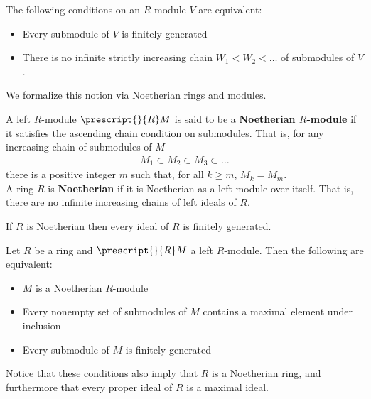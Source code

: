 \documentclass{memoir}
\begin{document}



\begin{prop}
	The following conditions on an \(R\)-module \(V\) are equivalent:
	\begin{itemize}
		\item Every submodule of \(V\) is finitely generated
		\item There is no infinite strictly increasing chain \(W_1 < W_2 < \ldots\) of submodules of \(V\).
	\end{itemize}
\end{prop}

We formalize this notion via Noetherian rings and modules.

\begin{defn}
A left \(R\)-module \(\prescript{}{R}M\) is said to be a \textbf{Noetherian \(R\)-module} if it satisfies the ascending chain condition on submodules. That is, for any increasing chain of submodules of \(M\) 
\begin{align*}
	M_1\subset M_2 \subset M_3 \subset \ldots
\end{align*}
there is a positive integer \(m\) such that, for all \(k\geq m\), \(M_k = M_m\).\\

	A ring \(R\) is \textbf{Noetherian} if it is Noetherian as a left module over itself. That is, there are no infinite increasing chains of left ideals of \(R\).
\end{defn}
\begin{cor}
	If \(R\) is Noetherian then every ideal of \(R\) is finitely generated.
\end{cor}

\begin{thm}
	Let \(R\) be a ring and \(\prescript{}{R}M\) a left \(R\)-module. Then the following are equivalent:
	\begin{itemize}
		\item \(M\) is a Noetherian \(R\)-module
		\item Every nonempty set of submodules of \(M\) contains a maximal element under inclusion
		\item Every submodule of \(M\) is finitely generated
	\end{itemize}
\end{thm}
Notice that these conditions also imply that \(R\) is a Noetherian ring, and furthermore that every proper ideal of \(R\) is a maximal ideal.
\end{document}
